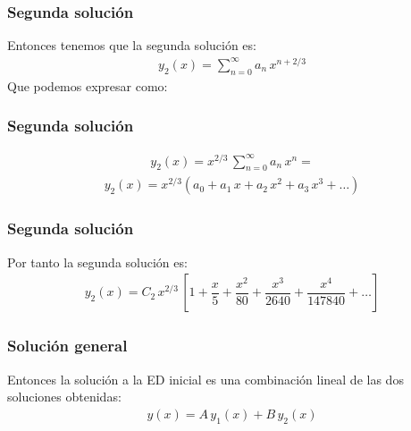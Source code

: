 \begin{frame}
\frametitle{Segunda solución}
Entonces tenemos que la segunda solución es:
\begin{align*}
y_{2}(x) = \sum_{n=0}^{\infty} a_{n} \, x^{n + 2/3}
\end{align*}
Que podemos expresar como:
\end{frame}
\begin{frame}
\frametitle{Segunda solución}
\begin{align*}
y_{2}(x) = x^{2/3} \, \sum_{n=0}^{\infty} a_{n} \, x^{n} = 
\end{align*}
\pause
\begin{align*}
y_{2} (x) =  x^{2/3} \left( a_{0} + a_{1} \, x + a_{2} \, x^{2} + a_{3} \, x^{3} + \ldots \right)
\end{align*}
\end{frame}
\begin{frame}
\frametitle{Segunda solución}
Por tanto la segunda solución es:
\begin{align*}
y_{2}(x) = C_{2} \, x^{2/3} \, \left[ 1 + \dfrac{x}{5} + \dfrac{x^{2}}{80} + \dfrac{x^{3}}{2640} + \dfrac{x^{4}}{147840} + \ldots \right]
\end{align*}
\end{frame}
\begin{frame}
\frametitle{Solución general}
Entonces la solución a la ED inicial es una combinación lineal de las dos soluciones obtenidas:
\begin{align*}
y(x) =  A \, y_{1}(x) + B \, y_{2}(x)
\end{align*}
\end{frame}
